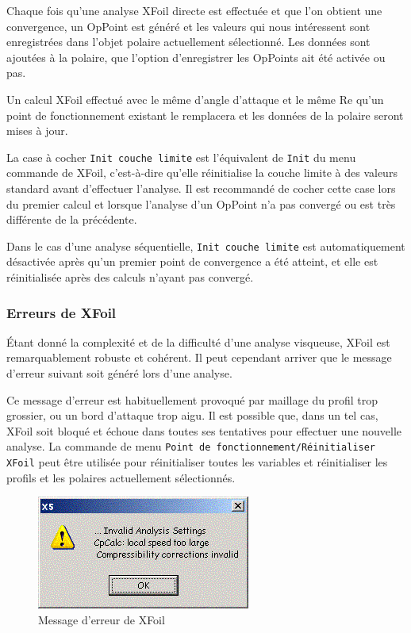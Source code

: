 \documentclass[a4paper,twoside,12pt,dvips]{article}
\begin{document}

Chaque fois qu’une analyse XFoil directe est effectuée et que l’on obtient 
une convergence, un OpPoint est généré et les valeurs qui nous intéressent
sont enregistrées dans l’objet polaire actuellement sélectionné. Les données 
sont ajoutées à la polaire, que l’option d’enregistrer les OpPoints ait été 
activée ou pas. 

Un calcul XFoil effectué avec le même d’angle d’attaque et le même Re qu’un 
point de fonctionnement existant le remplacera et les données de la polaire 
seront mises à jour. 

La case à cocher \texttt{Init couche limite} est l’équivalent de \texttt{Init} 
du menu commande de XFoil, c’est-à-dire qu’elle réinitialise la couche limite à
des valeurs standard avant d’effectuer l’analyse. Il est recommandé de cocher cette case lors du premier calcul et lorsque l’analyse d’un OpPoint n’a pas convergé ou est très différente de la précédente.

Dans le cas d’une analyse séquentielle, \texttt{Init couche limite} est automatiquement désactivée après qu’un premier point de convergence a été atteint, et elle est réinitialisée après des calculs n’ayant pas convergé.

\subsubsection{Erreurs de XFoil}

Étant donné la complexité et de la difficulté d’une analyse visqueuse, 
XFoil est remarquablement robuste et cohérent. Il peut cependant arriver que le 
message d’erreur suivant soit généré lors d’une analyse.

Ce message d’erreur est habituellement provoqué par maillage du profil trop grossier, ou un bord d’attaque trop aigu. Il est possible que, dans un tel cas, XFoil soit bloqué et échoue dans toutes ses tentatives pour effectuer une nouvelle analyse. La commande de menu \texttt{Point de fonctionnement/Réinitialiser XFoil} peut être utilisée pour réinitialiser toutes les variables et réinitialiser les profils et les polaires actuellement sélectionnés. 

\begin{figure}[htbp]
\centering
  \includegraphics[width=0.4\linewidth]{img-04}
  \caption{Message d’erreur de XFoil}
  \label{img:message_erreur_XFoil}
\end{figure}
\end{document}
